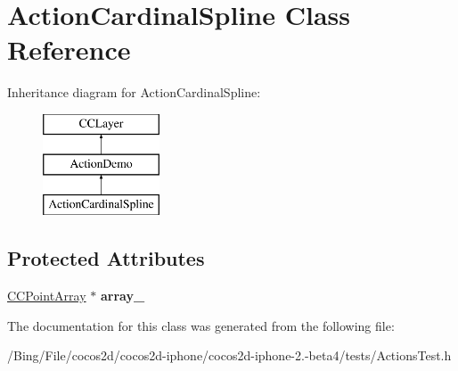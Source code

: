 \hypertarget{interface_action_cardinal_spline}{\section{Action\-Cardinal\-Spline Class Reference}
\label{interface_action_cardinal_spline}
}
Inheritance diagram for Action\-Cardinal\-Spline\-:\begin{figure}[H]
\begin{center}
\leavevmode
\includegraphics[height=3.000000cm]{interface_action_cardinal_spline}
\end{center}
\end{figure}
\subsection*{Protected Attributes}
\begin{DoxyCompactItemize}
\item 
\hypertarget{interface_action_cardinal_spline_a56ea7fe24fffdd81be726a2a60bbd549}{\hyperlink{interface_c_c_point_array}{C\-C\-Point\-Array} $\ast$ {\bfseries array\-\_\-}}\label{interface_action_cardinal_spline_a56ea7fe24fffdd81be726a2a60bbd549}

\end{DoxyCompactItemize}


The documentation for this class was generated from the following file\-:\begin{DoxyCompactItemize}
\item 
/\-Bing/\-File/cocos2d/cocos2d-\/iphone/cocos2d-\/iphone-\/2.-\/beta4/tests/Actions\-Test.\-h\end{DoxyCompactItemize}
